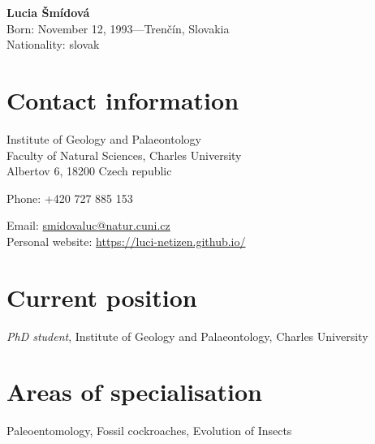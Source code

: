 \documentclass[11pt]{article} %
\begin{document}

{\LARGE\bfseries Lucia Šmídová} \\ %

Born: November 12, 1993---Trenčín, Slovakia\\ %
Nationality: slovak%

\begin{multicols}{2}
	\section*{Contact information}
	Institute of Geology and Palaeontology\\ %
	Faculty of Natural Sciences, Charles University\\ Albertov 6, 18200 Czech republic
	\medskip %
	




Phone: +420 727 885 153\ %


Email: \href{mailto:smidovaluc@natur.cuni.cz}{smidovaluc@natur.cuni.cz}\\ %
Personal website: \href{https://luci-netizen.github.io/personal_website/index.html}{https://luci-netizen.github.io/}\\ %

\vspace{0.03\textheight} %




\section*{Current position}

\emph{PhD student}, Institute of Geology and Palaeontology, Charles University %


\section*{Areas of specialisation}

Paleoentomology, Fossil cockroaches, Evolution of Insects %

\end{multicols}
\end{document}
